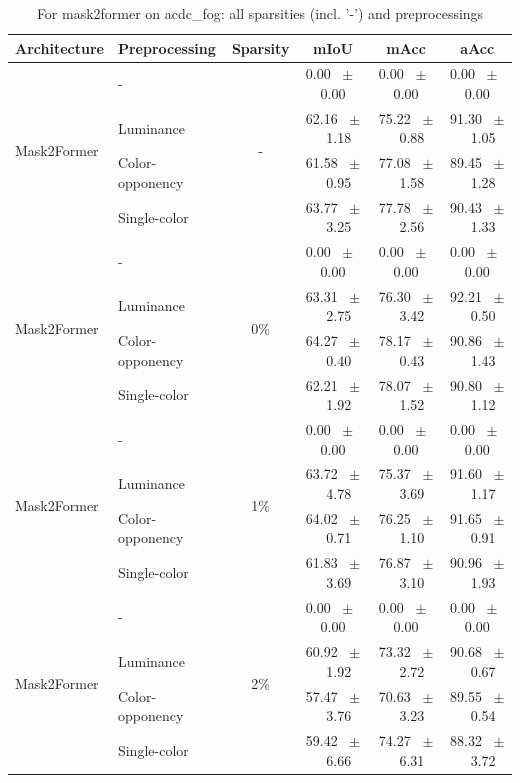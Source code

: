 \begin{table}[h]
  \centering
  \caption{For mask2former on acdc_fog: all sparsities (incl. '-') and preprocessings}
  \begin{tabular}{@{}l l c c c c@{}}
    \toprule
    Architecture & Preprocessing & Sparsity & mIoU & mAcc & aAcc \\
    \midrule
    \multirow{4}{*}{Mask2Former} & - & \multirow{4}{*}{-} & 0.00 ~$\pm$~ 0.00 & 0.00 ~$\pm$~ 0.00 & 0.00 ~$\pm$~ 0.00 \\
    & Luminance &  & 62.16 ~$\pm$~ 1.18 & 75.22 ~$\pm$~ 0.88 & 91.30 ~$\pm$~ 1.05 \\
    & Color-opponency &  & 61.58 ~$\pm$~ 0.95 & 77.08 ~$\pm$~ 1.58 & 89.45 ~$\pm$~ 1.28 \\
    & Single-color &  & 63.77 ~$\pm$~ 3.25 & 77.78 ~$\pm$~ 2.56 & 90.43 ~$\pm$~ 1.33 \\
    \midrule
    \multirow{4}{*}{Mask2Former} & - & \multirow{4}{*}{0\%} & 0.00 ~$\pm$~ 0.00 & 0.00 ~$\pm$~ 0.00 & 0.00 ~$\pm$~ 0.00 \\
    & Luminance &  & 63.31 ~$\pm$~ 2.75 & 76.30 ~$\pm$~ 3.42 & 92.21 ~$\pm$~ 0.50 \\
    & Color-opponency &  & 64.27 ~$\pm$~ 0.40 & 78.17 ~$\pm$~ 0.43 & 90.86 ~$\pm$~ 1.43 \\
    & Single-color &  & 62.21 ~$\pm$~ 1.92 & 78.07 ~$\pm$~ 1.52 & 90.80 ~$\pm$~ 1.12 \\
    \midrule
    \multirow{4}{*}{Mask2Former} & - & \multirow{4}{*}{1\%} & 0.00 ~$\pm$~ 0.00 & 0.00 ~$\pm$~ 0.00 & 0.00 ~$\pm$~ 0.00 \\
    & Luminance &  & 63.72 ~$\pm$~ 4.78 & 75.37 ~$\pm$~ 3.69 & 91.60 ~$\pm$~ 1.17 \\
    & Color-opponency &  & 64.02 ~$\pm$~ 0.71 & 76.25 ~$\pm$~ 1.10 & 91.65 ~$\pm$~ 0.91 \\
    & Single-color &  & 61.83 ~$\pm$~ 3.69 & 76.87 ~$\pm$~ 3.10 & 90.96 ~$\pm$~ 1.93 \\
    \midrule
    \multirow{4}{*}{Mask2Former} & - & \multirow{4}{*}{2\%} & 0.00 ~$\pm$~ 0.00 & 0.00 ~$\pm$~ 0.00 & 0.00 ~$\pm$~ 0.00 \\
    & Luminance &  & 60.92 ~$\pm$~ 1.92 & 73.32 ~$\pm$~ 2.72 & 90.68 ~$\pm$~ 0.67 \\
    & Color-opponency &  & 57.47 ~$\pm$~ 3.76 & 70.63 ~$\pm$~ 3.23 & 89.55 ~$\pm$~ 0.54 \\
    & Single-color &  & 59.42 ~$\pm$~ 6.66 & 74.27 ~$\pm$~ 6.31 & 88.32 ~$\pm$~ 3.72 \\
    \midrule

\end{tabular}
\end{table}
